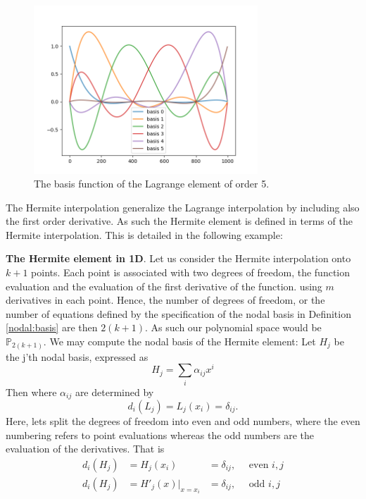 \begin{figure}
\begin{center}
\includegraphics[width=0.75\textwidth]{chapters/element/plots/Lagrange5.png}
\caption{
The basis function of the Lagrange element of order 5. }
\label{fig:Lagrange5}
\end{center}
\end{figure}


The Hermite interpolation generalize the Lagrange interpolation by including also the first order derivative. As such 
the Hermite element is defined in terms of the Hermite interpolation. This is detailed in the following example: 
\begin{exmp}{\textbf{The Hermite element in 1D}.} 
\label{hermite:element}
Let us consider the Hermite interpolation onto $k+1$ points.  
Each point is associated with two degrees of freedom, the function evaluation and the evaluation of the first 
derivative of the function.  
using $m$ derivatives in each point. Hence,  
the number of degrees of freedom, or the number of equations defined by the specification of the nodal 
basis in Definition \ref{nodal:basis} are then $2(k+1)$. As such our polynomial space would be $\mathbb{P}_{2(k+1)}$.    
We may compute the nodal basis of the Hermite element: 
Let $H_j$ be the j'th nodal basis, expressed as  
\[ 
H_j = \sum_i \alpha_{ij} x^i 
\]
Then 
where $\alpha_{ij}$ are determined by 
\[ 
d_i(L_j) = L_j(x_i) = \delta_{ij} . 
\]
Here, lets split the degrees of freedom into even and odd numbers, where the even numbering refers to 
point evaluations whereas the odd numbers are the evaluation of the derivatives. 
That is 
\begin{align*} 
d_i(H_j) &= H_j(x_i)  &=  \delta_{ij}, \quad \mbox{ even } i,j   \\
d_i(H_j) &= H'_j(x) |_{x=x_i} &= \delta_{ij}, \quad \mbox{ odd } i,j  
\end{align*}

\end{exmp}


